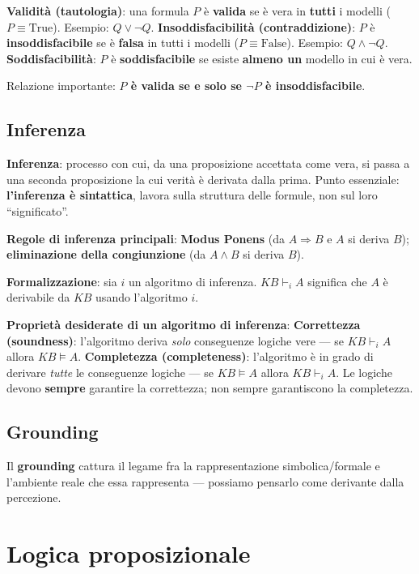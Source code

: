 \documentclass[11pt,a4paper]{report}
\begin{document}
\textbf{Validità (tautologia)}: una formula $P$ è \textbf{valida} se è vera in \textbf{tutti} i modelli ($P \equiv \text{True}$). Esempio: $Q\vee\neg Q$. \textbf{Insoddisfacibilità (contraddizione)}: $P$ è \textbf{insoddisfacibile} se è \textbf{falsa} in tutti i modelli ($P \equiv \text{False}$). Esempio: $Q\wedge\neg Q$. \textbf{Soddisfacibilità}: $P$ è \textbf{soddisfacibile} se esiste \textbf{almeno un} modello in cui è vera.

Relazione importante: \textbf{$P$ è valida se e solo se $\neg P$ è insoddisfacibile}.

\subsection*{Inferenza}

\textbf{Inferenza}: processo con cui, da una proposizione accettata come vera, si passa a una seconda proposizione la cui verità è derivata dalla prima. Punto essenziale: \textbf{l'inferenza è sintattica}, lavora sulla struttura delle formule, non sul loro ``significato''.

\textbf{Regole di inferenza principali}: \textbf{Modus Ponens} (da $A\Rightarrow B$ e $A$ si deriva $B$); \textbf{eliminazione della congiunzione} (da $A\wedge B$ si deriva $B$).

\textbf{Formalizzazione}: sia $i$ un algoritmo di inferenza. $KB \vdash_i A$ significa che $A$ è derivabile da $KB$ usando l'algoritmo $i$.

\textbf{Proprietà desiderate di un algoritmo di inferenza}: \textbf{Correttezza (soundness)}: l'algoritmo deriva \emph{solo} conseguenze logiche vere --- se $KB \vdash_i A$ allora $KB \models A$. \textbf{Completezza (completeness)}: l'algoritmo è in grado di derivare \emph{tutte} le conseguenze logiche --- se $KB \models A$ allora $KB \vdash_i A$. Le logiche devono \textbf{sempre} garantire la correttezza; non sempre garantiscono la completezza.

\subsection*{Grounding}

Il \textbf{grounding} cattura il legame fra la rappresentazione simbolica/formale e l'ambiente reale che essa rappresenta --- possiamo pensarlo come derivante dalla percezione.

\section{Logica proposizionale}
\end{document}
